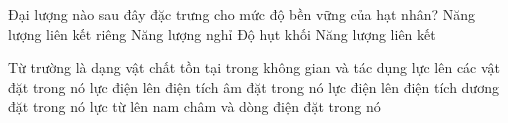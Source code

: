 	\begin{ex}%
		Đại lượng nào sau đây đặc trưng cho mức độ bền vững của hạt nhân?
		\choice
		{\True Năng lượng liên kết riêng}
		{Năng lượng nghỉ}
		{Độ hụt khối}
		{Năng lượng liên kết}
	\end{ex}

	\begin{ex}%
		Từ trường là dạng vật chất tồn tại trong không gian và tác dụng
		\choice
		{lực lên các vật đặt trong nó}
		{lực điện lên điện tích âm đặt trong nó}
		{lực điện lên điện tích dương đặt trong nó}
		{\True lực từ lên nam châm và dòng điện đặt trong nó}
	\end{ex}


